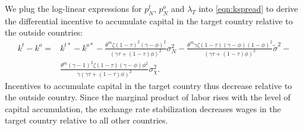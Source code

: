 We plug the log-linear expressions for $p^t_N$, $p^o_N$ and
$\lambda_T$ into \eqref{eqn:kspread} to derive the differential
incentive to accumulate capital in the target country relative to the
outside countries:
\begin{align*}
  k^t - k^o =
  & k^{t \ast} - k^{o \ast} 
    - \frac{\theta^m \zeta (1 - \tau)^2 (\gamma - \phi)^2}{\left( \gamma \tau + (1 - \tau) \phi \right)^2}
    \sigma_N^2 
    - \frac{\theta^m \gamma \zeta (1 - \tau) (\gamma - \phi) (1 - \phi)^2}{\left( \gamma \tau + (1 - \tau) \phi \right)^2} \tilde{\sigma}^2 - \\
  & \frac{\theta^m (\gamma - 1)^2 \zeta (1 - \tau)(\gamma - \phi) \phi^2}{\gamma \left( 
    \gamma \tau + (1 - \tau) \phi \right)^2}\sigma_{\chi}^2.
\end{align*}
Incentives to accumulate capital in the target country thus decrease
relative to the outside country. Since the marginal product of labor
rises with the level of capital accumulation, the exchange rate
stabilization decreases wages in the target country relative to all
other countries.



